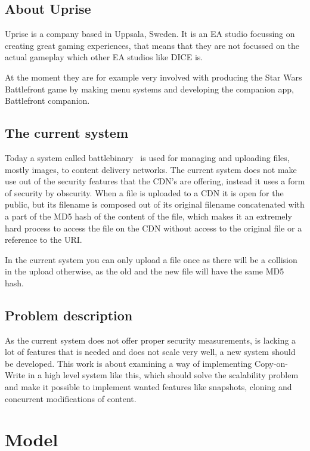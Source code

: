 \documentclass[a4paper,12pt]{article}
\begin{document}
\subsection{About Uprise}
Uprise is a company based in Uppsala, Sweden. It is an EA studio focussing on creating great gaming experiences, that means 
that they are not focussed on the actual gameplay which other EA studios like DICE is. 

At the moment they are for example very involved with producing the Star Wars Battlefront game by making menu systems and 
developing the companion app, Battlefront companion.

\subsection{The current system}
Today a system called battlebinary~\cite{BATTLEBINARY} is used for managing and uploading files, mostly images, to content 
delivery networks. The current system does not make use out of the security features that the CDN's are offering, instead it 
uses a form of security by obscurity. When a file is uploaded to a CDN it is open for the public, but its filename is 
composed out of its original filename concatenated with a part of the MD5 hash of the content of the file, which makes it an 
extremely hard process to access the file on the CDN without access to the original file or a reference to the URI.

In the current system you can only upload a file once as there will be a collision in the upload otherwise, as the old and 
the new file will have the same MD5 hash.  

\subsection{Problem description}
As the current system does not offer proper security measurements, is lacking a lot of features that is needed and does not 
scale very well, a new system should be developed. This work is about examining a way of implementing Copy-on-Write in a 
high level system like this, which should solve the scalability problem and make it possible to implement wanted features
like snapshots, cloning and concurrent modifications of content.

\newpage 
\section{Model}
\end{document}
